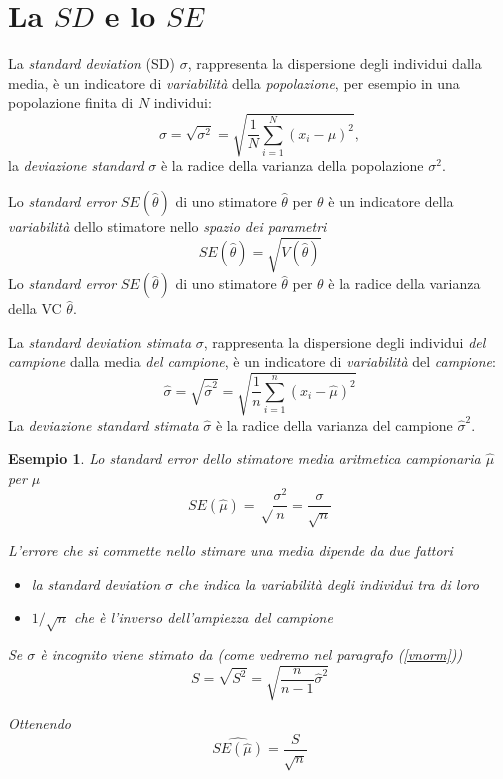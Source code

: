 \documentclass[
  11pt,
]{book}
\providecommand{\tightlist}{%
  \setlength{\itemsep}{0pt}\setlength{\parskip}{0pt}}
\theoremstyle{mytheoremstyle}
\theoremstyle{mydefstyle}
\newtheorem{example}{{Esempio}}[section]
\begin{document}
\section{\texorpdfstring{La \(SD\) e lo \(SE\)}{La SD e lo SE}}\label{la-sd-e-lo-se}

\begin{info}
La \emph{standard deviation} (SD) \(\sigma\), rappresenta la dispersione degli individui dalla media, è un indicatore di \emph{variabilità} della \emph{popolazione}, per esempio in una popolazione finita di \(N\) individui:
\[\sigma=\sqrt{\sigma^2}=\sqrt{\frac 1 N\sum_{i=1}^N(x_i-\mu)^2},\]
la \emph{deviazione standard} \(\sigma\) è la radice della varianza della popolazione \(\sigma^2\).

Lo \emph{standard error} \(SE(\hat\theta)\) di uno stimatore \(\hat\theta\) per \(\theta\) è un indicatore della \emph{variabilità} dello stimatore nello \emph{spazio dei parametri}
\[SE(\hat\theta)=\sqrt{V(\hat\theta)}\]
Lo \emph{standard error} \(SE(\hat\theta)\) di uno stimatore \(\hat\theta\) per \(\theta\) è la radice della varianza della VC \(\hat\theta\).

La \emph{standard deviation stimata} \(\sigma\), rappresenta la dispersione degli individui \emph{del campione} dalla media \emph{del campione}, è un indicatore di \emph{variabilità} del \emph{campione}:
\[\hat\sigma=\sqrt{\hat\sigma^2}=\sqrt{\frac 1 n\sum_{i=1}^n(x_i-\hat\mu)^2}\]
La \emph{deviazione standard stimata} \(\hat\sigma\) è la radice della varianza del campione \(\hat\sigma^2\).

\end{info}

\begin{example}
Lo standard error dello stimatore media aritmetica campionaria \(\hat\mu\) per \(\mu\)
\[SE(\hat \mu)=\sqrt\frac{\sigma^2} n=\frac\sigma {\sqrt{n}}\]

L'errore che si commette nello stimare una media dipende da due fattori

\begin{itemize}
\tightlist
\item
  la \emph{standard deviation} \(\sigma\) che indica la variabilità degli individui tra di loro
\item
  \(1/\sqrt n\) che è l'inverso dell'ampiezza del campione
\end{itemize}

Se \(\sigma\) è incognito viene stimato da (come vedremo nel paragrafo (\ref{vnorm}))
\[S=\sqrt{S^2}=\sqrt{\frac{n}{n-1}\hat\sigma^2}\]

Ottenendo
\[\widehat{SE(\hat\mu)}=\frac S {\sqrt n}\]
\end{example}
\end{document}

